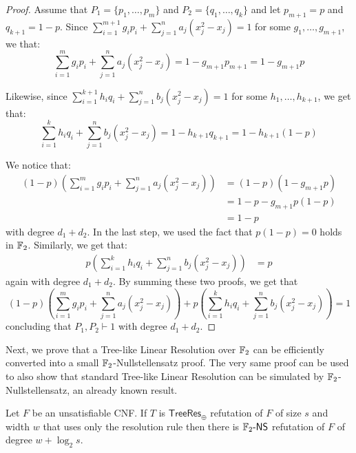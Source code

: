 \begin{proof}
 Assume that $P_1 = \{p_1, \ldots, p_m\}$ and $P_2 = \{q_1, \ldots, q_k\}$ and let $p_{m+1} = p$ and $q_{k+1} = 1-p$. Since $\sum_{i = 1}^{m+1} g_i p_i + \sum_{j = 1}^n a_j (x_j^2-x_j) = 1$ for some $g_1, \ldots, g_{m+1}$, we that:
\[\sum_{i = 1}^{m} g_i p_i + \sum_{j = 1}^n a_j (x_j^2-x_j) = 1 - g_{m+1} p_{m+1} = 1-g_{m+1} p\]
    
\noindent
 Likewise, since $\sum_{i = 1}^{k+1} h_i q_i + \sum_{j = 1}^n b_j (x_j^2-x_j) = 1$ for some $h_1, \ldots, h_{k+1}$, we get that:
\[\sum_{i = 1}^{k} h_iq_i + \sum_{j = 1}^n b_j (x_j^2-x_j) = 1-h_{k+1}q_{k+1} = 1-h_{k+1}(1-p)\]

\noindent
 We notice that:
    \[\begin{split}
 (1-p) \left (\sum_{i = 1}^{m} g_i p_i + \sum_{j = 1}^n a_j (x_j^2-x_j) \right ) &= (1-p)(1-g_{m+1} p) \\
        &= 1-p - g_{m+1}p (1-p) \\
        &= 1-p
    \end{split}\]
 with degree $d_1+d_2$. In the last step, we used the fact that $p(1-p) = 0$ holds in $\mathbb{F}_2$. Similarly, we get that:
    \[\begin{split}
 p\left (\sum_{i = 1}^{k} h_iq_i + \sum_{j = 1}^n b_j (x_j^2-x_j)  \right ) &= p 
    \end{split}\]
 again with degree $d_1+d_2$. By summing these two proofs, we get that 
    \[(1-p) \left (\sum_{i = 1}^{m} g_i p_i + \sum_{j = 1}^n a_j (x_j^2-x_j) \right ) + p \left (\sum_{i = 1}^{k} h_iq_i + \sum_{j = 1}^n b_j (x_j^2-x_j) \right )= 1\]
 concluding that $P_1, P_2 \vdash 1$ with degree $d_1 + d_2$.
\end{proof}

Next, we prove that a Tree-like Linear Resolution over $\mathbb{F}_2$ can be efficiently converted into a small $\mathbb{F}_2$-Nullstellensatz proof. The very same proof can be used to also show that standard Tree-like Linear Resolution can be simulated by $\mathbb{F}_2$-Nullstellensatz, an already known result.

\begin{lemma}
    \label{treeref_no_weak}
 Let $F$ be an unsatisfiable CNF. If $T$ is $\mathsf{TreeRes}_\oplus$ refutation of $F$ of size $s$ and width $w$ that uses only the resolution rule then there is $\mathbb{F}_2\text{-}\mathsf{NS}$ refutation of $F$ of degree $w+\log_2 s$.
\end{lemma}

